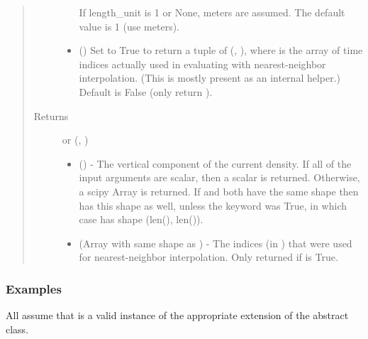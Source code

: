 \documentclass[letterpaper,10pt,english]{sphinxmanual}
\begin{document}
\begin{fulllineitems}
\begin{fulllineitems}
\begin{quote}
\begin{description}
\begin{itemize}
If length\_unit is 1 or None, meters are assumed. The default
value is 1 (use meters).


\item {} 
 () \textendash{} Set to True to return a tuple of (,
), where  is the array of time indices
actually used in evaluating  with nearest-neighbor
interpolation. (This is mostly present as an internal helper.)
Default is False (only return ).

\end{itemize}

\item[{Returns}] \leavevmode

 or (, )
\begin{itemize}
\item {} 
 () - The vertical component of the
current density. If all of the input arguments are scalar, then a
scalar is returned. Otherwise, a scipy Array is returned. If 
and  both have the same shape then  has this shape as well,
unless the  keyword was True, in which case  has
shape (len(), len()).

\item {} 
 (Array with same shape as ) - The indices
(in ) that were used for
nearest-neighbor interpolation. Only returned if  is
True.

\end{itemize}


\end{description}\end{quote}
\subsubsection*{Examples}

All assume that  is a valid instance of the appropriate
extension of the {\hyperref[\detokenize{eqtools:eqtools.core.Equilibrium}]{}} abstract class.


\end{fulllineitems}
\end{fulllineitems}
\end{document}
